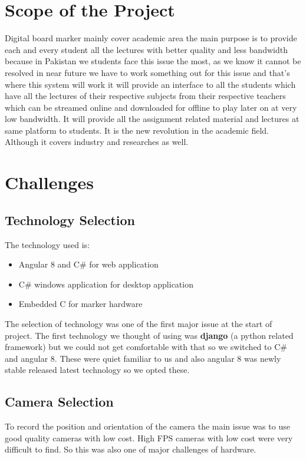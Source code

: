 \section{Scope of the Project}
Digital board marker mainly cover academic area the main purpose is to provide each and every student all the lectures with better quality and less bandwidth because in Pakistan we students face this issue the most, as we know it cannot be resolved in near future we have to work something out for this issue and that’s where this system will work it will provide an interface to all the students which have all the lectures of their respective subjects from their respective teachers which can be streamed online and downloaded for offline to play later on at very low bandwidth. It will provide all the assignment related material and lectures at same platform to students. It is the new revolution in the academic field. Although it covers industry and researches as well.
\bigskip

\section{Challenges}
\bigskip
\subsection{Technology Selection}
The technology used is:
\begin{itemize}

\item Angular 8 and C\# for web application
\item C\# windows application for desktop application
\item Embedded C for marker hardware

\end{itemize}

The selection of technology was one of the first major issue at the start of project. The first technology we thought of using was \textbf{django} (a python related framework) but we could not get comfortable with that so we switched to C\# and angular 8. These were quiet familiar to us and also angular 8 was newly stable released latest technology so we opted these.
\bigskip


\subsection{Camera Selection}
To record the position and orientation of the camera the main issue was to use good quality cameras with low cost. High FPS cameras with low cost were very difficult to find. So this was also one of major challenges of hardware.
\bigskip


